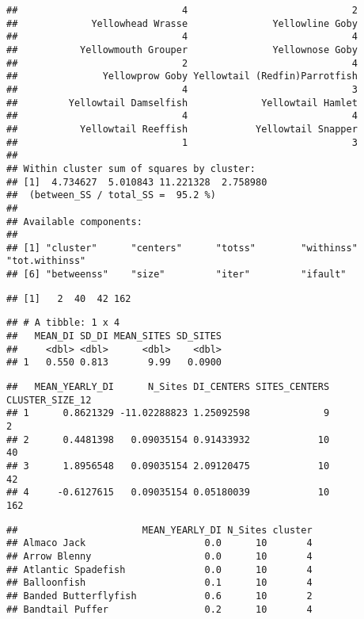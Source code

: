 \documentclass[
]{article}
\begin{document}
\begin{verbatim}
##                             4                             2 
##             Yellowhead Wrasse               Yellowline Goby 
##                             4                             4 
##           Yellowmouth Grouper               Yellownose Goby 
##                             2                             4 
##               Yellowprow Goby Yellowtail (Redfin)Parrotfish 
##                             4                             3 
##         Yellowtail Damselfish             Yellowtail Hamlet 
##                             4                             4 
##           Yellowtail Reeffish            Yellowtail Snapper 
##                             1                             3 
## 
## Within cluster sum of squares by cluster:
## [1]  4.734627  5.010843 11.221328  2.758980
##  (between_SS / total_SS =  95.2 %)
## 
## Available components:
## 
## [1] "cluster"      "centers"      "totss"        "withinss"     "tot.withinss"
## [6] "betweenss"    "size"         "iter"         "ifault"
\end{verbatim}

\begin{verbatim}
## [1]   2  40  42 162
\end{verbatim}

\begin{verbatim}
## # A tibble: 1 x 4
##   MEAN_DI SD_DI MEAN_SITES SD_SITES
##     <dbl> <dbl>      <dbl>    <dbl>
## 1   0.550 0.813       9.99   0.0900
\end{verbatim}

\begin{verbatim}
##   MEAN_YEARLY_DI      N_Sites DI_CENTERS SITES_CENTERS CLUSTER_SIZE_12
## 1      0.8621329 -11.02288823 1.25092598             9               2
## 2      0.4481398   0.09035154 0.91433932            10              40
## 3      1.8956548   0.09035154 2.09120475            10              42
## 4     -0.6127615   0.09035154 0.05180039            10             162
\end{verbatim}

\begin{verbatim}
##                      MEAN_YEARLY_DI N_Sites cluster
## Almaco Jack                     0.0      10       4
## Arrow Blenny                    0.0      10       4
## Atlantic Spadefish              0.0      10       4
## Balloonfish                     0.1      10       4
## Banded Butterflyfish            0.6      10       2
## Bandtail Puffer                 0.2      10       4
\end{verbatim}
\end{document}
